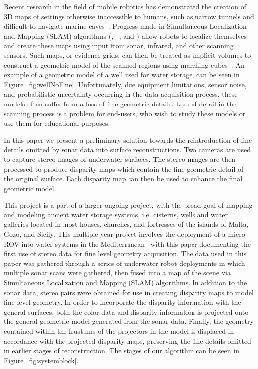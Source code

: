 \documentclass[twocolumn]{article}
\begin{document}
\noindent Recent research in the field of mobile robotics has demonstrated the creation of 3D maps of settings otherwise inaccessible to humans, such as narrow tunnels and difficult to navigate marine caves~\cite{ICEX11,McVicker,McVicker2}. Progress made in Simultaneous Localization and Mapping (SLAM) algorithms  (\cite{Williams2000}, ~\cite{harbor}, and \cite{Fairfield2005,Fairfield2006}) allow robots to localize themselves and create these maps using input from sonar, infrared, and other scanning sensors. Such maps, or evidence grids, can then be treated as implicit volumes to construct a geometric model of the scanned regions using marching cubes~\cite{Lorensen}. An example of a geometric model of a well used for water storage, can be seen in Figure~\ref{fig:wellNoFine}.
Unfortunately, due equipment limitations, sensor noise, and probabilistic uncertainty occurring in the  data acquisition process, these models often suffer from a loss of fine geometric details. Loss of detail in the scanning process is a problem for end-users, who wish to study these models or use them for educational purposes.

In this paper we present a preliminary solution towards the reintroduction of fine details omitted by sonar data into surface reconstructions.  
Two cameras are used to capture stereo images of underwater surfaces.
The stereo images are then processed to produce disparity maps which contain the fine geometric detail of the original surface.
Each disparity map can then be used to enhance the final geometric model.

This project is a part of a larger ongoing project, with the broad goal of mapping and modeling ancient water storage systems, i.e. cisterns, wells and water galleries located in most houses, churches, and fortresses of the islands of Malta, Gozo, and Sicily. This multiple year project involves the deployment of a micro-ROV into water systems in the Mediterranean~\cite{White10,ICEX11,McVicker,McVicker2} with this paper documenting the first use of stereo data for fine level geometry acquisition. The data used in this paper was gathered through a series of underwater robot deployments in which multiple sonar scans were gathered, then fused into a map of the scene via Simultaneous Localization and Mapping (SLAM) algorithms. In addition to the sonar data, stereo pairs were obtained for use in creating disparity maps to model fine level geometry. In order to incorporate the disparity information with the general surfaces, both the color data and disparity information is projected onto the  general geometric model generated from the sonar data. Finally, the geometry contained within the frustums of the projectors in the model is displaced in accordance with the projected disparity maps, preserving the fine details omitted in earlier stages of reconstruction. The stages of our algorithm can be seen in Figure~\ref{fig:systemblock}.
\end{document}
